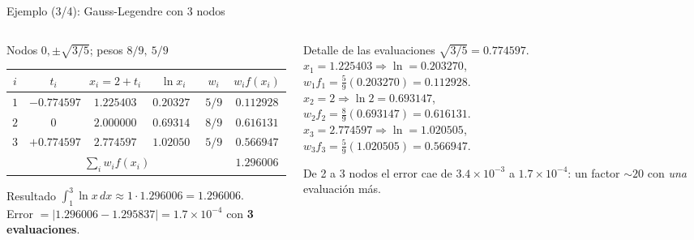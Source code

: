\documentclass[aspectratio=169,10pt]{beamer}
\begin{document}
\begin{frame}{Ejemplo (3/4): Gauss-Legendre con 3 nodos}
\begin{columns}[T]
\begin{column}{0.55\textwidth}
\begin{cardgear}{Nodos $0,\pm\sqrt{3/5}$; pesos $8/9,\ 5/9$}{\faTable}
\centering
{\footnotesize\renewcommand{\arraystretch}{1.4}\setlength{\tabcolsep}{4pt}
\begin{tabular}{c|c|c|c|c|c}
$i$ & $t_i$ & $x_i{=}2{+}t_i$ & $\ln x_i$ & $w_i$ & $w_i f(x_i)$\\\hline
$1$ & $-0.774597$ & $1.225403$ & $0.203270$ & $5/9$ & $0.112928$\\
$2$ & $0$ & $2.000000$ & $0.693147$ & $8/9$ & $0.616131$\\
$3$ & $+0.774597$ & $2.774597$ & $1.020505$ & $5/9$ & $0.566947$\\\hline
\multicolumn{5}{c|}{$\displaystyle\sum_i w_i f(x_i)$} & $1.296006$\\
\end{tabular}}
\end{cardgear}
\vspace{1mm}
\begin{cardidea}{Resultado}{\faCheckCircle}
{\footnotesize $\displaystyle\int_1^3\ln x\,dx\approx 1\cdot 1.296006=1.296006.$\\[0.4mm]
Error $=|1.296006-1.295837|=1.7{\times}10^{-4}$ con \textbf{3 evaluaciones}.}
\end{cardidea}
\end{column}
\begin{column}{0.43\textwidth}
\begin{cardidea}{Detalle de las evaluaciones}{\faCalculator}
{\footnotesize $\sqrt{3/5}=0.774597$.\\[0.5mm]
$x_1=1.225403\Rightarrow\ln=0.203270$,\\[0.2mm]
$w_1 f_1=\tfrac59(0.203270)=0.112928$.\\[0.5mm]
$x_2=2\Rightarrow\ln2=0.693147$,\\[0.2mm]
$w_2 f_2=\tfrac89(0.693147)=0.616131$.\\[0.5mm]
$x_3=2.774597\Rightarrow\ln=1.020505$,\\[0.2mm]
$w_3 f_3=\tfrac59(1.020505)=0.566947$.}
\end{cardidea}
\vspace{1mm}
\begin{cardnota}[\faArrowDown]
{\footnotesize De 2 a 3 nodos el error cae de $3.4{\times}10^{-3}$ a $1.7{\times}10^{-4}$: un factor $\sim20$ con \emph{una} evaluación más.}
\end{cardnota}
\end{column}
\end{columns}
\end{frame}
\end{document}
